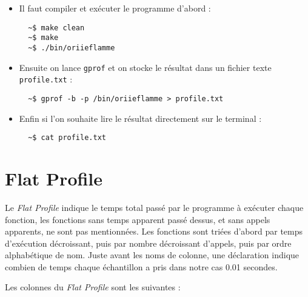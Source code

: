 \documentclass[a4paper, 12pt]{article}
\begin{document}
\begin{itemize}[label=$\cdot$]

\item Il faut compiler et exécuter le programme d'abord :

\begin{verbatim}
  ~$ make clean
  ~$ make
  ~$ ./bin/oriieflamme
\end{verbatim}

\item Ensuite on lance \verb|gprof| et on stocke le résultat dans un fichier texte \verb|profile.txt| :

\begin{verbatim}
  ~$ gprof -b -p /bin/oriieflamme > profile.txt
\end{verbatim}

\item Enfin si l'on souhaite lire le résultat directement sur le terminal :

\begin{verbatim}
  ~$ cat profile.txt
\end{verbatim}

\end{itemize}

\section{Flat Profile}

Le \emph{Flat Profile} indique le temps total passé par le programme à exécuter chaque fonction, les fonctions sans temps apparent passé dessus, et sans appels apparents, ne sont pas mentionnées. Les fonctions sont triées d'abord par temps d'exécution décroissant, puis par nombre décroissant d'appels, puis par ordre alphabétique de nom. Juste avant les noms de colonne, une déclaration indique combien de temps chaque échantillon a pris dans notre cas 0.01 secondes.\\

\newpage

Les colonnes du \emph{Flat Profile} sont les suivantes :
\end{document}
